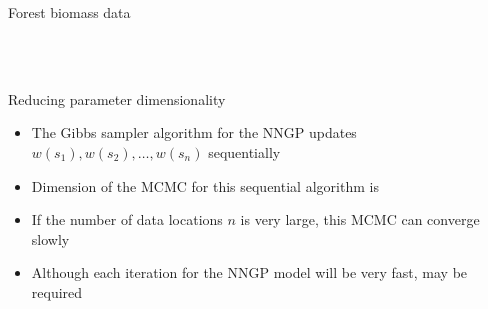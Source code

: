 \begin{frame}{Forest biomass data}

\begin{figure}[]
\begin{center}
\vskip -5mm
\\  \vskip-2.5mm
\\
\end{center}
\label{fig:bio-coefs}
\end{figure}
\end{frame}

\begin{frame}{Reducing parameter dimensionality}
	\begin{itemize}
		\item The Gibbs sampler algorithm for the NNGP updates $w(s_1), w(s_2), \ldots, w(s_n)$ sequentially
		\item Dimension of the MCMC for this \alert{sequential} algorithm is 
		\item If the number of data locations $n$ is very large, this  MCMC can converge slowly
		\item Although each iteration for the NNGP model will be very fast,  may be required
	\end{itemize}
\end{frame}

